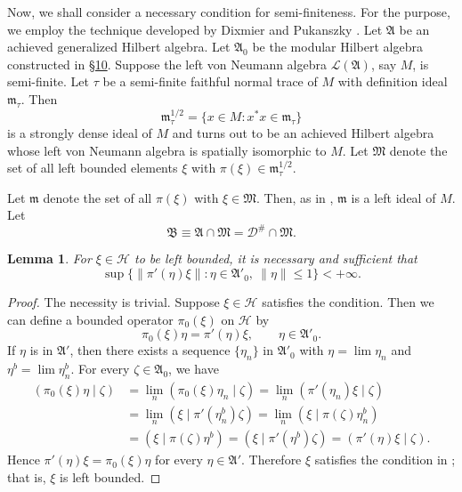 \documentclass[12pt,b5paper,twoside]{article}
\theoremstyle{takesaki}
\newtheorem{lemma}{Lemma}[section]
\numberwithin{equation}{section}
\begin{document}
Now, we shall consider a necessary condition for semi-finiteness.  For
the purpose, we employ the technique developed by Dixmier \cite{ref4}
and Pukanszky \cite{ref26}.  Let $\mathfrak A$ be an achieved
generalized Hilbert algebra.  Let $\mathfrak A_0$ be the modular
Hilbert algebra constructed in \hyperref[sec:10]{\S10}.  Suppose the
left von Neumann algebra $\mathcal L(\mathfrak A)$, say $M$, is
semi-finite.  Let $\tau$ be a semi-finite faithful normal trace of $M$
with definition ideal $\mathfrak m_\tau$.  Then
\[
 \mathfrak m_\tau^{1/2}
 =\{x\in M:x^*x\in\mathfrak m_\tau\}
\]
is a strongly dense ideal of $M$ and turns out to be an achieved
Hilbert algebra whose left von Neumann algebra is spatially isomorphic
to $M$.  Let $\mathfrak M$ denote the set of all left bounded elements
$\xi$ with $\pi(\xi)\in\mathfrak m_\tau^{1/2}$.

Let $\mathfrak m$ denote the set of all $\pi(\xi)$ with
$\xi\in\mathfrak M$.  Then, as in , $\mathfrak m$ is a
left ideal of $M$.  Let
\[
 \mathfrak B\equiv\mathfrak A\cap\mathfrak M
 =\mathcal D^{\#}\cap\mathfrak M.
\]

\begin{lemma}\label{lem:14.6}
For $\xi\in\mathcal H$ to be left bounded, it is necessary and
sufficient that
\[
 \sup\{\|\pi'(\eta)\xi\|:\eta\in\mathfrak A'_0,\ \|\eta\|\leq1\}
 <+\infty.
\]
\end{lemma}

\begin{proof}
The necessity is trivial.  Suppose $\xi\in\mathcal H$ satisfies the
condition.  Then we can define a bounded operator $\pi_0(\xi)$ on
$\mathcal H$ by
\[
 \pi_0(\xi)\eta=\pi'(\eta)\xi,
 \qquad \eta\in\mathfrak A'_0.
\]
If $\eta$ is in $\mathfrak A'$, then there exists a sequence
$\{\eta_n\}$ in $\mathfrak A'_0$ with
$\eta=\lim\eta_n$ and $\eta^b=\lim\eta_n^b$.  For every
$\zeta\in\mathfrak A_0$, we have
\begin{align*}
 (\pi_0(\xi)\eta\mid\zeta)
 &=\lim_n(\pi_0(\xi)\eta_n\mid\zeta)
  =\lim_n(\pi'(\eta_n)\xi\mid\zeta)\\
 &=\lim_n(\xi\mid\pi'(\eta_n^b)\zeta)
  =\lim_n(\xi\mid\pi(\zeta)\eta_n^b)\\
 &=(\xi\mid\pi(\zeta)\eta^b)
  =(\xi\mid\pi'(\eta^b)\zeta)
  =(\pi'(\eta)\xi\mid\zeta).
\end{align*}
Hence $\pi'(\eta)\xi=\pi_0(\xi)\eta$ for every
$\eta\in\mathfrak A'$.  Therefore $\xi$ satisfies the condition in
; that is, $\xi$ is left bounded.
\end{proof}
\end{document}

